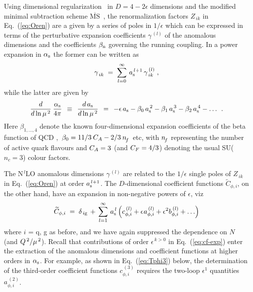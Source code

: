 \documentclass[12pt]{article}
\newcommand{\beq}{\begin{equation}}
\newcommand{\eeq}{\end{equation}}
\newcommand{\MSb}{$\overline{\mbox{MS}}$}
\newcommand{\as}{\alpha_{\rm s}}
\newcommand{\ar}{a_{\rm s}}
\newcommand{\ep}{\epsilon}
\begin{document}
Using dimensional regularization~\cite{DimReg} in $ D = 4 - 2\ep $ dimensions 
and the modified minimal subtraction scheme \MSb\ \cite{BBDM78,MS}, the 
renormalization factors $Z_{\,ik}$ in Eq.~(\ref{eq:Oren}) are a given by a 
series of poles in $1/\ep$ which can be expressed in terms of the perturbative 
expansion coefficients $\gamma^{\,(l)}$ of the anomalous dimensions and the 
coefficients $\beta_{\rm n}$ governing the running coupling.
In a power expansion in $\as$ the former can be written as
%
\beq
\label{eq:gam-exp}
  \gamma_{\,ik}^{} \; = \; 
  \sum_{l=0}^{\infty}\, a_{\rm s}^{\,l+1}\, \gamma_{\,ik}^{\,(l)} \; ,
\eeq
%
while the latter are given by 
%
\beq
\label{eq:arun}
  \frac{d}{d \ln \mu^{\,2}}\: \frac{\as}{4\pi} \:\: \equiv \:\: 
  \frac{d\,\ar}{d \ln \mu^{\,2}} \:\: = \:\: - \ep\, \ar 
  - \beta_0\, \ar^{\,2} - \beta_1\, \ar^{\,3} 
  - \beta_2\, \ar^{\,4} - \ldots \:\: .
\eeq
%
Here $\beta_{1, \ldots, 4 }$ denote the known four-dimensional expansion 
coefficients of the beta function of QCD \cite{AsymptF,beta1,beta2,beta3}, 
$\,\beta_0 = 11/3\:{C_A} - 2/3\:{n^{}_{\! f}}\,$ etc, with ${n^{}_{\! f}}$ representing the number of 
active quark flavours and ${C_A}=3$ (and ${C_F}=4/3$) denoting the usual 
SU($n_c\!=\!3$) colour factors.

The N$^{\,l}$LO anomalous dimensions $\gamma^{\,(l)}$ are related to the 
$1/\ep$ single poles of $Z_{\,ik}$ in Eq.~(\ref{eq:Oren}) at order 
$a_{\rm s}^{\,l+1}$. The $D$-dimensional coefficient functions 
$\widetilde{C}_{\phi,i}$, on the other hand, have an expansion in non-negative 
powers of $\ep$, viz
%
\beq
\label{eq:cf-exp}
  \widetilde{C}_{\phi,i} \; = \; \delta_{\,i \rm g} \,
    + \,\sum_{l=1}^{\infty} \, \ar^{\, l} \left( c_{\phi,i}^{\,(l)} 
    + \ep\:\! a_{\phi,i}^{\,(l)} + \ep^2 b_{\phi,i}^{\,(l)} + \ldots \right)
\eeq
%
where $i$ = q, g as before, and we have again suppressed the dependence on $N$ 
(and ${Q^{\, 2}}/\mu^{\,2}$). Recall that contributions of order $\ep^{\,k>0}$ in 
Eq.~(\ref{eq:cf-exp}) enter the extraction of the anomalous dimensions and 
coefficient functions at higher orders in $\as$. For example, as shown in 
Eq.~(\ref{eq:Tphi3}) below, the determination of the third-order coefficient 
functions $c_{\phi,i}^{\,(3)}$ requires the two-loop $\ep^1$ quantities 
$a_{\phi,i}^{\,(2)}$.
\end{document}
